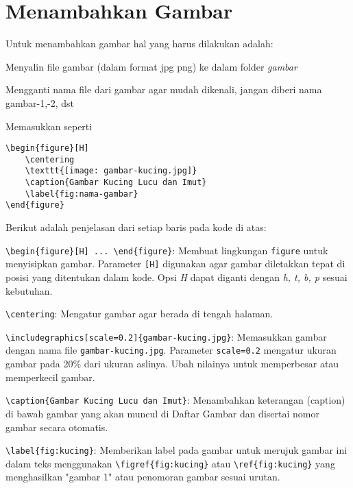 

\section{Menambahkan Gambar}
Untuk menambahkan gambar hal yang harus dilakukan adalah:
\begin{packed_enum}
    \item Menyalin file gambar (dalam format jpg \/ png) ke dalam folder \textit{gambar}
    \item Mengganti nama file dari gambar agar mudah dikenali, jangan diberi nama gambar-1,-2, dst
    \item Memasukkan seperti 
\end{packed_enum}

\begin{lstlisting}[caption=Kode untuk Menyisipkan Gambar dalam Dokumen, label=lst:kode-gambar]
\begin{figure}[H]
    \centering
    \texttt{[image: gambar-kucing.jpg]}
    \caption{Gambar Kucing Lucu dan Imut}
    \label{fig:nama-gambar}
\end{figure}
\end{lstlisting}

\noindent Berikut adalah penjelasan dari setiap baris pada kode di atas:

\begin{packed_enum}
    \item \texttt{\textbackslash begin\{figure\}[H] ... \textbackslash end\{figure\}}: Membuat lingkungan \texttt{figure} untuk menyisipkan gambar. Parameter \texttt{[H]} digunakan agar gambar diletakkan tepat di posisi yang ditentukan dalam kode. Opsi \textit{H} dapat diganti dengan \textit{h, t, b, p} sesuai kebutuhan.
    \item \texttt{\textbackslash centering}: Mengatur gambar agar berada di tengah halaman.
    \item \texttt{\textbackslash includegraphics[scale=0.2]\{gambar-kucing.jpg\}}: Memasukkan gambar dengan nama file \texttt{gambar-kucing.jpg}. Parameter \texttt{scale=0.2} mengatur ukuran gambar pada 20\% dari ukuran aslinya. Ubah nilainya untuk memperbesar atau memperkecil gambar.
    \item \texttt{\textbackslash caption\{Gambar Kucing Lucu dan Imut\}}: Menambahkan keterangan (caption) di bawah gambar yang akan muncul di Daftar Gambar dan disertai nomor gambar secara otomatis.
    \item \texttt{\textbackslash label\{fig:kucing\}}: Memberikan label pada gambar untuk merujuk gambar ini dalam teks menggunakan \texttt{\textbackslash figref\{fig:kucing\}} atau \texttt{\textbackslash ref\{fig:kucing\}} yang menghasilkan "gambar 1" atau penomoran gambar sesuai urutan.
\end{packed_enum}

